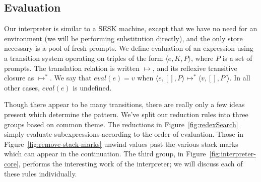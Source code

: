\documentclass[11pt]{article}
\newcommand{\maybePage}{\newpage}
\newcommand{\tuple}[1]{\langle{}{#1}\rangle{}}
\newcommand{\angles}[1]{\langle#1\rangle}
\begin{document}
\maybePage
\subsection{Evaluation}

Our interpreter is similar to a SESK machine, except that we have no need for an environment (we will be performing substitution directly), and the only store necessary is a pool of fresh prompts.
We define evaluation of an expression using a transition system operating on triples of the form $\angles{e,K,P}$, where $P$ is a set of prompts.
The translation relation is written $\longmapsto$, and its reflexive transitive closure as $\longmapsto^*$.
We say that $eval(e) = v$ when $\angles{e,[],P} \longmapsto^* \tuple{v,[],P'}$.
In all other cases, $eval(e)$ is undefined.

Though there appear to be many transitions, there are really only a few ideas present which determine the pattern.
We've split our reduction rules into three groups based on common theme.
The reductions in Figure~\ref{fig:redexSearch} simply evaluate subexpressions according to the order of evaluation.
Those in Figure~\ref{fig:remove-stack-marks} unwind values past the various stack marks which can appear in the continuation.
The third group, in Figure~\ref{fig:interpreter-core}, performs the interesting work of the interpreter;
we will discuss each of these rules individually.
\end{document}

